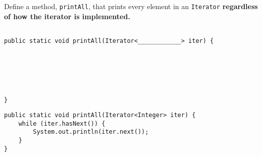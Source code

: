 \question Define a method, \lstinline$printAll$, that prints every element in
an \lstinline$Iterator$ \textbf{regardless of how the iterator is
implemented.}
\ifprintanswers\else
\begin{lstlisting}

public static void printAll(Iterator<____________> iter) {






}
\end{lstlisting}
\fi

\begin{solution}%
\begin{lstlisting}
public static void printAll(Iterator<Integer> iter) {
    while (iter.hasNext()) {
        System.out.println(iter.next());
    }
}
\end{lstlisting}
\end{solution}
